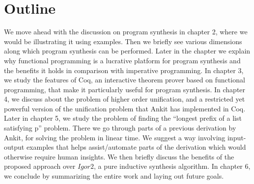 \section{Outline}
We move ahead with the discussion on program synthesis in chapter 2, where we would be illustrating it using examples. Then we briefly see various dimensions along which program synthesis can be performed. Later in the chapter we explain why functional programming is a lucrative platform for program synthesis and the benefits it holds in comparison with imperative programming. In chapter 3, we study the features of Coq, an interactive theorem prover based on functional programming, that make it particularly useful for program synthesis. In chapter 4, we discuss about the problem of higher order unification, and a restricted yet powerful version of the unification problem that Ankit has implemented in Coq. Later in chapter 5, we study the problem of finding the ``longest prefix of a list satisfying p'' problem. There we go through parts of a previous derivation by Ankit, for solving the problem in linear time. We suggest a way involving input-output examples that helps assist/automate parts of the derivation which would otherwise require human insights. We then briefly discuss the benefits of the proposed approach over $Igor2$, a pure inductive synthesis algorithm. In chapter 6, we conclude by summarizing the entire work and laying out future goals.